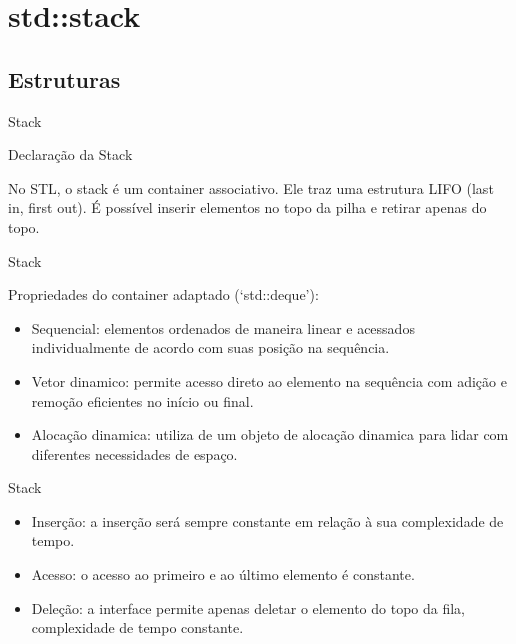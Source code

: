 \section{std::stack}

\subsection{Estruturas}

\begin{frame}[fragile]{Stack}

    \begin{block}{Declaração da Stack}
    \end{block}
	
    No STL, o stack é um container associativo. Ele traz uma estrutura LIFO (last in, first out). É possível inserir elementos no topo da pilha e retirar apenas do topo.
    
\end{frame}

\begin{frame}[fragile]{Stack}


    Propriedades do container adaptado (`std::deque'):
    \begin{itemize}
        \item Sequencial: elementos ordenados de maneira linear e acessados individualmente de acordo com suas posição na sequência.
        \item Vetor dinamico: permite acesso direto ao elemento na sequência com adição e remoção eficientes no início ou final.
        \item Alocação dinamica: utiliza de um objeto de alocação dinamica para lidar com diferentes necessidades de espaço.
    \end{itemize}

\end{frame}

\begin{frame}[fragile]{Stack}

    \begin{itemize}
        \item Inserção: a inserção será sempre constante em relação à sua complexidade de tempo.
        \item Acesso: o acesso ao primeiro e ao último elemento é constante.
        \item Deleção: a interface permite apenas deletar o elemento do topo da fila, complexidade de tempo constante.
    \end{itemize}

\end{frame}


